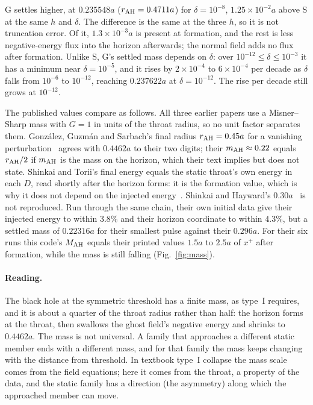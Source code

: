 \documentclass[11pt]{article}
\newcommand{\AH}{{\rm AH}}
\begin{document}
G settles higher, at $0.235548a$ ($r_\AH=0.4711a$) for $\delta=10^{-8}$, $1.25\times10^{-2}a$ above S at the same $h$
and $\delta$. The difference is the same at the three $h$, so it is not truncation error. Of it, $1.3\times10^{-3}a$ is
present at formation, and the rest is less negative-energy flux into the horizon afterwards; the normal field adds no
flux after formation. Unlike S, G's settled mass depends on $\delta$: over $10^{-12}\le\delta\le10^{-3}$ it has a minimum near
$\delta=10^{-5}$, and it rises by
$2\times10^{-4}$ to $6\times10^{-4}$ per decade as $\delta$ falls from $10^{-6}$ to $10^{-12}$, reaching $0.237622a$ at
$\delta=10^{-12}$. The rise per decade still grows at $10^{-12}$.

The published values compare as follows. All three earlier papers use a Misner--Sharp mass with $G=1$ in units of the
throat radius, so no unit factor separates them. Gonz\'alez, Guzm\'an and Sarbach's final radius $r_\AH=0.45a$ for a
vanishing perturbation~\cite{GGS2009b} agrees with $0.4462a$ to their two digits; their $m_\AH\approx0.22$ equals
$r_\AH/2$ if $m_\AH$ is the mass on the horizon, which their text implies but does not state. Shinkai and Torii's final
energy equals the static throat's own energy in each $D$, read shortly after the horizon forms: it is the formation
value, which is why it does not depend on the injected energy~\cite{ST2017}. Shinkai and Hayward's
$0.30a$~\cite{SH2002} is not reproduced. Run through the same chain, their own initial data give their injected energy
to within $3.8\%$ and their horizon coordinate to within $4.3\%$, but a settled mass of $0.22316a$ for their smallest
pulse against their $0.296a$. For their six runs this code's $M_\AH$ equals their printed values $1.5a$ to $2.5a$ of
$x^+$ after formation, while the mass is still falling (Fig.~\ref{fig:mass}).

\paragraph{Reading.} The black hole at the symmetric threshold has a finite mass, as type~I requires, and it is about a
quarter of the throat radius rather than half: the horizon forms at the throat, then swallows the ghost field's
negative energy and shrinks to $0.4462a$. The mass is not universal. A family that approaches a different static member
ends with a different mass, and for that family the mass keeps changing with the distance from threshold. In textbook
type~I collapse the mass scale comes from the field equations; here it comes from the throat, a property of the data,
and the static family has a direction (the asymmetry) along which the approached member can move.
\end{document}
